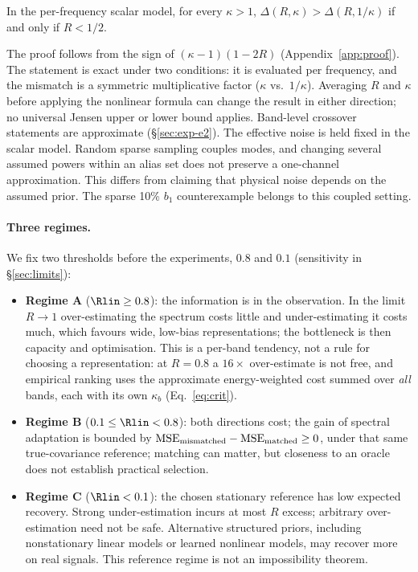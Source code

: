 \begin{corollary}\label{cor:flip}
In the per-frequency scalar model, for every $\kappa>1$,
$\Delta(R,\kappa)>\Delta(R,1/\kappa)$ if and only if $R<1/2$.
\end{corollary}
\noindent The proof follows from the sign of $(\kappa-1)(1-2R)$
(Appendix~\ref{app:proof}). The statement is exact under two conditions: it is
evaluated per frequency, and the mismatch is a symmetric multiplicative factor
($\kappa$ vs.\ $1/\kappa$). Averaging $R$ and $\kappa$ before applying the nonlinear formula can change the result in either direction; no universal Jensen upper or lower bound applies. Band-level crossover statements are approximate (\S\ref{sec:exp-e2}). The effective noise is held fixed in the scalar model. Random sparse
sampling couples modes, and changing several assumed powers within an
alias set does not preserve a one-channel approximation. This differs from
claiming that physical noise depends on the assumed prior. The sparse
10\% $b_1$ counterexample belongs to this coupled setting.

\paragraph{Three regimes.} We fix two thresholds before the experiments,
$0.8$ and $0.1$ (sensitivity in \S\ref{sec:limits}):
\begin{itemize}
\item \textbf{Regime A} ($\Rlin\ge0.8$): the information is in the
observation. In the limit $R\to1$ over-estimating the spectrum costs
little and under-estimating it costs much, which favours wide, low-bias
representations; the bottleneck is then capacity and optimisation. This is a
per-band tendency, not a rule for choosing a representation: at $R=0.8$ a
$16\times$ over-estimate is not free, and empirical ranking uses the approximate
energy-weighted cost summed over \emph{all} bands, each with its own
$\kappa_b$ (Eq.~\eqref{eq:crit}).
\item \textbf{Regime B} ($0.1\le\Rlin<0.8$): both directions cost; the gain of
spectral adaptation is bounded by
$\mathrm{MSE}_{\rm mismatched}-\mathrm{MSE}_{\rm matched}\ge0$, under that same true-covariance reference; matching can matter, but closeness to an oracle does not establish practical selection.
\item \textbf{Regime C} ($\Rlin<0.1$): the chosen stationary reference has low expected recovery. Strong under-estimation incurs at most $R$ excess; arbitrary over-estimation need not be safe. Alternative structured priors, including nonstationary linear models or learned nonlinear models, may recover more on real signals. This reference regime is not an impossibility theorem.
\end{itemize}

